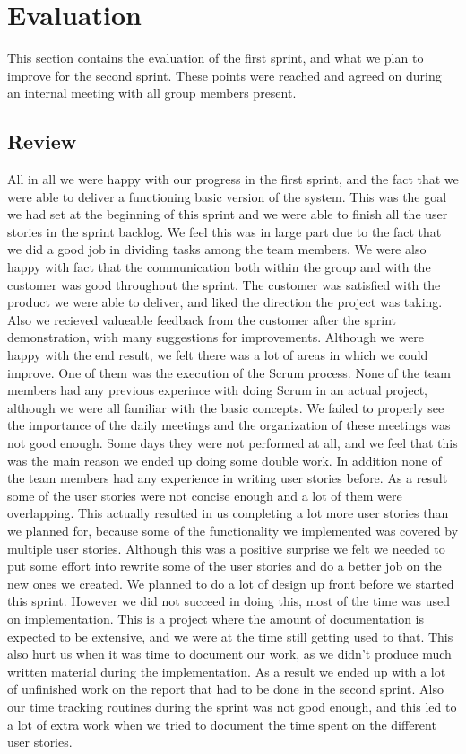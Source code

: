 \section{Evaluation}
This section contains the evaluation of the first sprint, and what we plan to improve for the second sprint. These points were reached and agreed on during an internal meeting with all group members present.

\subsection{Review}
All in all we were happy with our progress in the first sprint, and the fact that we were able to deliver a functioning basic version of the system. This was the goal we had set at the beginning of this sprint and we were able to finish all the user stories in the sprint backlog. We feel this was in large part due to the fact that we did a good job in dividing tasks among the team members. We were also happy with fact that the communication both within the group and with the customer was good throughout the sprint. The customer was satisfied with the product we were able to deliver, and liked the direction the project was taking. Also we recieved valueable feedback from the customer after the sprint demonstration, with many suggestions for improvements.
\newline
\newline
Although we were happy with the end result, we felt there was a lot of areas in which we could improve. One of them was the execution of the Scrum process. None of the team members had any previous experince with doing Scrum in an actual project, although we were all familiar with the basic concepts. We failed to properly see the importance of the daily meetings and the organization of these meetings was not good enough. Some days they were not performed at all, and we feel that this was the main reason we ended up doing some double work. In addition none of the team members had any experience in writing user stories before. As a result some of the user stories were not concise enough and a lot of them were overlapping. This actually resulted in us completing a lot more user stories than we planned for, because some of the functionality we implemented was covered by multiple user stories. Although this was a positive surprise we felt we needed to put some effort into rewrite some of the user stories and do a better job on the new ones we created.
\newline
\newline
We planned to do a lot of design up front before we started this sprint. However we did not succeed in doing this, most of the time was used on implementation. This is a project where the amount of documentation is expected to be extensive, and we were at the time still getting used to that. This also hurt us when it was time to document our work, as we didn't produce much written material during the implementation. As a result we ended up with a lot of unfinished work on the report that had to be done in the second sprint. Also our time tracking routines during the sprint was not good enough, and this led to a lot of extra work when we tried to document the time spent on the different user stories.

